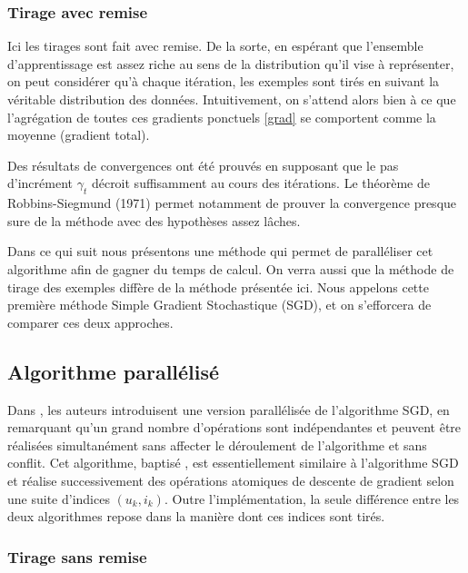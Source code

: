 \documentclass[10pt,a4paper]{article}
\begin{document}
\subsubsection*{Tirage avec remise}

Ici les tirages sont fait avec remise. De la sorte, en espérant que l'ensemble d'apprentissage est assez riche au sens de la distribution qu'il vise à représenter, on peut considérer qu'à chaque itération, les exemples sont tirés en suivant la véritable distribution des données. Intuitivement, on s'attend alors bien à ce que l'agrégation de toutes ces gradients ponctuels \eqref{grad} se comportent comme la moyenne (gradient total).

Des résultats de convergences ont été prouvés en supposant que le pas d'incrément $\gamma_t$ décroit suffisamment au cours des itérations. Le théorème de Robbins-Siegmund (1971) permet notamment de prouver la convergence presque sure de la méthode avec des hypothèses assez lâches.

Dans ce qui suit nous présentons une méthode qui permet de paralléliser cet algorithme afin de gagner du temps de calcul. On verra aussi que la méthode de tirage des exemples diffère de la méthode présentée ici. Nous appelons cette première méthode Simple Gradient Stochastique (SGD), et on s'efforcera de comparer ces deux approches.

\subsection{Algorithme parallélisé \jel }

Dans \cite{jelly}, les auteurs introduisent une version parallélisée de l'algorithme SGD, en remarquant qu'un grand nombre d'opérations sont indépendantes et peuvent être réalisées simultanément sans affecter le déroulement de l'algorithme et sans conflit. Cet algorithme, baptisé \jel, est essentiellement similaire à l'algorithme SGD et réalise successivement des opérations atomiques de descente de gradient selon une suite d'indices $(u_k,i_k)$. Outre l'implémentation, la seule différence entre les deux algorithmes repose dans la manière dont ces indices sont tirés.

\subsubsection*{Tirage sans remise}
\end{document}
